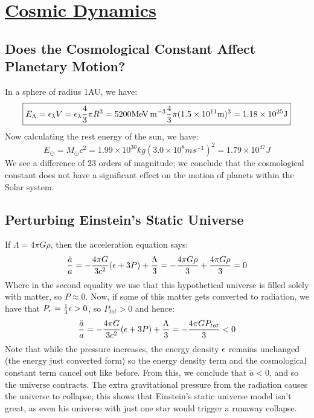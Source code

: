 \section[Cosmic Dynamics]{\hyperlink{toc}{Cosmic Dynamics}}

\subsection{Does the Cosmological Constant Affect Planetary Motion?}
In a sphere of radius 1AU, we have:
\begin{equation}
    \boxed{E_{\Lambda} = \e_{\lambda}V = \e_{\lambda}\frac{4}{3}\pi R^3 = 5200 \si{MeV.m^{-3}} \frac{4}{3}\pi (1.5 \times 10^{11}\si{m})^3 = 1.18 \times 10^{25} \si{J}}
\end{equation}
Now calculating the rest energy of the sun, we have:
\begin{equation}
    \boxed{E_{\odot} = M_{\odot}c^2 = 1.99 \times 10^{30}\si{kg} (3.0 \times 10^{8}\si{ms^{-1}})^2 = 1.79 \times 10^{47}\si{J}}
\end{equation}
We see a difference of 23 orders of magnitude; we conclude that the cosmological constant does not have a significant effect on the motion of planets within the Solar system.

\subsection{Perturbing Einstein's Static Universe}
If $\Lambda = 4\pi G \rho$, then the acceleration equation says:
\begin{equation}
    \frac{\ddot{a}}{a} = -\frac{4\pi G}{3c^2}(\e + 3P) + \frac{\Lambda}{3} = -\frac{4\pi G\rho}{3} + \frac{4\pi G \rho}{3} = 0
\end{equation}
Where in the second equality we use that this hypothetical universe is filled solely with matter, so $P \approx 0$. Now, if some of this matter gets converted to radiation, we have that $P_{r} = \frac{1}{3}\e > 0$, so $P_{tot} > 0$ and hence:
\begin{equation}
    \frac{\ddot{a}}{a} = -\frac{4\pi G}{3c^2}(\e + 3P) + \frac{\Lambda}{3} = -\frac{4\pi G P_{tot}}{3} < 0
\end{equation} 
Note that while the pressure increases, the energy density $\e$ remains unchanged (the energy just converted form) so the energy density term and the cosmological constant term cancel out like before. From this, we conclude that $\ddot{a} < 0$, and so $\boxed{\text{the universe contracts}}$. The extra gravitational pressure from the radiation causes the universe to collapse; this shows that Einstein's static universe model isn't great, as even his universe with just one star would trigger a runaway collapse.

